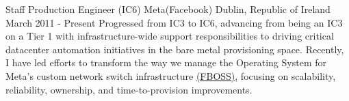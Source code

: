 

\begin{cventries}

  \cventry
  {Staff Production Engineer (IC6)} %
  {Meta(Facebook)} %
  {Dublin, Republic of Ireland} %
  {March 2011 - Present} %
  {
    Progressed from IC3 to IC6, advancing from being an IC3 on a Tier 1 with infrastructure-wide support responsibilities to
    driving critical datacenter automation initiatives in the bare metal provisioning space.
    Recently, I have led efforts to transform the way
    we manage the Operating System for Meta's custom network switch infrastructure
    \href{https://engineering.fb.com/2015/03/10/data-center-engineering/facebook-open-switching-system-fboss-and-wedge-in-the-open/}{(FBOSS)},
    focusing on scalability, reliability, ownership, and time-to-provision improvements.
  }
  \vspace{5mm}


\end{cventries}
